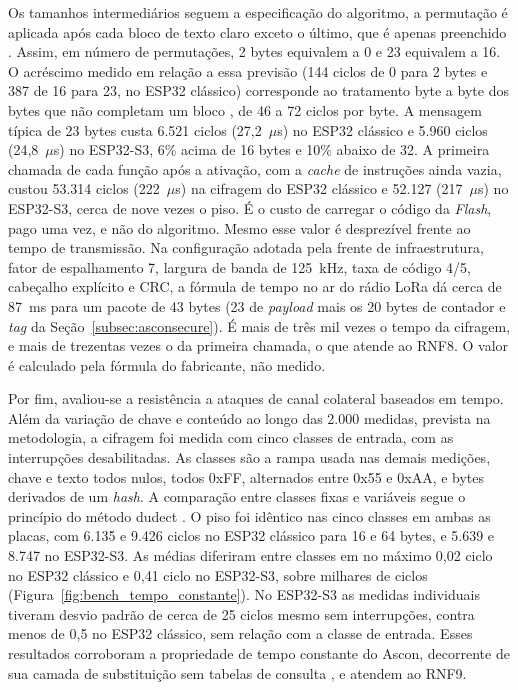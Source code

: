 Os tamanhos intermediários seguem a especificação do algoritmo, a permutação é aplicada após cada bloco de texto claro exceto o último, que é apenas preenchido \cite{ascon_v12_spec}. Assim, em número de permutações, 2 bytes equivalem a 0 e 23 equivalem a 16. O acréscimo medido em relação a essa previsão (144 ciclos de 0 para 2 bytes e 387 de 16 para 23, no ESP32 clássico) corresponde ao tratamento byte a byte dos bytes que não completam um bloco \cite{weatherley2023ascon}, de 46 a 72 ciclos por byte. A mensagem típica de 23 bytes custa 6.521 ciclos (27,2~$\mu$s) no ESP32 clássico e 5.960 ciclos (24,8~$\mu$s) no ESP32-S3, 6\% acima de 16 bytes e 10\% abaixo de 32. A primeira chamada de cada função após a ativação, com a \textit{cache} de instruções ainda vazia, custou 53.314 ciclos (222~$\mu$s) na cifragem do ESP32 clássico e 52.127 (217~$\mu$s) no ESP32-S3, cerca de nove vezes o piso. É o custo de carregar o código da \textit{Flash}, pago uma vez, e não do algoritmo. Mesmo esse valor é desprezível frente ao tempo de transmissão. Na configuração adotada pela frente de infraestrutura, fator de espalhamento 7, largura de banda de 125~kHz, taxa de código 4/5, cabeçalho explícito e CRC, a fórmula de tempo no ar do rádio LoRa \cite{semtech2015sx1276} dá cerca de 87~ms para um pacote de 43 bytes (23 de \textit{payload} mais os 20 bytes de contador e \textit{tag} da Seção~\ref{subsec:asconsecure}). É mais de três mil vezes o tempo da cifragem, e mais de trezentas vezes o da primeira chamada, o que atende ao RNF8. O valor é calculado pela fórmula do fabricante, não medido.

Por fim, avaliou-se a resistência a ataques de canal colateral baseados em tempo. Além da variação de chave e conteúdo ao longo das 2.000 medidas, prevista na metodologia, a cifragem foi medida com cinco classes de entrada, com as interrupções desabilitadas. As classes são a rampa usada nas demais medições, chave e texto todos nulos, todos 0xFF, alternados entre 0x55 e 0xAA, e bytes derivados de um \textit{hash}. A comparação entre classes fixas e variáveis segue o princípio do método dudect \cite{reparaz2017dudect}. O piso foi idêntico nas cinco classes em ambas as placas, com 6.135 e 9.426 ciclos no ESP32 clássico para 16 e 64 bytes, e 5.639 e 8.747 no ESP32-S3. As médias diferiram entre classes em no máximo 0,02 ciclo no ESP32 clássico e 0,41 ciclo no ESP32-S3, sobre milhares de ciclos (Figura~\ref{fig:bench_tempo_constante}). No ESP32-S3 as medidas individuais tiveram desvio padrão de cerca de 25 ciclos mesmo sem interrupções, contra menos de 0,5 no ESP32 clássico, sem relação com a classe de entrada. Esses resultados corroboram a propriedade de tempo constante do Ascon, decorrente de sua camada de substituição sem tabelas de consulta \cite{ascon_v12_spec}, e atendem ao RNF9.

